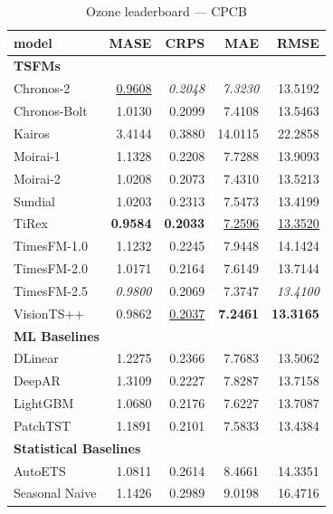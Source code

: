 \begin{table}[H]
\caption{Ozone leaderboard --- CPCB}
\centering
\begin{small}
\begin{tabular}{lrrrr}
\toprule
model & MASE & CRPS & MAE & RMSE \\
\midrule
\multicolumn{5}{l}{\textbf{TSFMs}} \\
Chronos-2 & \underline{0.9608} & \textit{0.2048} & \textit{7.3230} & 13.5192 \\
Chronos-Bolt & 1.0130 & 0.2099 & 7.4108 & 13.5463 \\
Kairos & 3.4144 & 0.3880 & 14.0115 & 22.2858 \\
Moirai-1 & 1.1328 & 0.2208 & 7.7288 & 13.9093 \\
Moirai-2 & 1.0208 & 0.2073 & 7.4310 & 13.5213 \\
Sundial & 1.0203 & 0.2313 & 7.5473 & 13.4199 \\
TiRex & \textbf{0.9584} & \textbf{0.2033} & \underline{7.2596} & \underline{13.3520} \\
TimesFM-1.0 & 1.1232 & 0.2245 & 7.9448 & 14.1424 \\
TimesFM-2.0 & 1.0171 & 0.2164 & 7.6149 & 13.7144 \\
TimesFM-2.5 & \textit{0.9800} & 0.2069 & 7.3747 & \textit{13.4100} \\
VisionTS++ & 0.9862 & \underline{0.2037} & \textbf{7.2461} & \textbf{13.3165} \\
\midrule
\multicolumn{5}{l}{\textbf{ML Baselines}} \\
DLinear & 1.2275 & 0.2366 & 7.7683 & 13.5062 \\
DeepAR & 1.3109 & 0.2227 & 7.8287 & 13.7158 \\
LightGBM & 1.0680 & 0.2176 & 7.6227 & 13.7087 \\
PatchTST & 1.1891 & 0.2101 & 7.5833 & 13.4384 \\
\midrule
\multicolumn{5}{l}{\textbf{Statistical Baselines}} \\
AutoETS & 1.0811 & 0.2614 & 8.4661 & 14.3351 \\
Seasonal Naive & 1.1426 & 0.2989 & 9.0198 & 16.4716 \\
\bottomrule
\end{tabular}
\end{small}
\end{table}